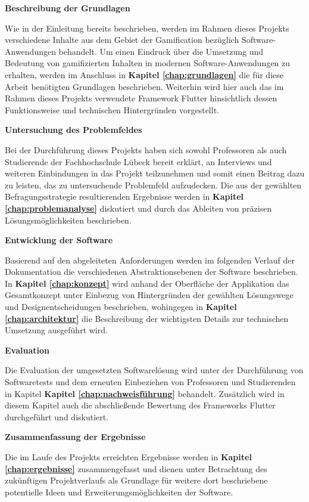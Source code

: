 \documentclass[bibliography=totoc,listof=totoc,BCOR=5mm,DIV=12,oneside]{scrbook}
\begin{document}
\par \bigskip \textbf{Beschreibung der Grundlagen}
\par Wie in der Einleitung bereits beschrieben, werden im Rahmen dieses Projekts verschiedene Inhalte aus dem Gebiet der Gamification bezüglich Software-Anwendungen behandelt. Um einen Eindruck über die Umsetzung und Bedeutung von gamifizierten Inhalten in modernen Software-Anwendungen zu erhalten, werden im Anschluss in \textbf{Kapitel \ref{chap:grundlagen}} die für diese Arbeit benötigten Grundlagen beschrieben. Weiterhin wird hier auch das im Rahmen dieses Projekts verwendete Framework Flutter hinsichtlich dessen Funktionsweise und technischen Hintergründen vorgestellt.

\par \bigskip \textbf{Untersuchung des Problemfeldes}
\par Bei der Durchführung dieses Projekts haben sich sowohl Professoren als auch Studierende der Fachhochschule Lübeck bereit erklärt, an Interviews und weiteren Einbindungen in das Projekt teilzunehmen und somit einen Beitrag dazu zu leisten, das zu untersuchende Problemfeld aufzudecken. Die aus der gewählten Befragungsstrategie resultierenden Ergebnisse werden in \textbf{Kapitel \ref{chap:problemanalyse}} diskutiert und durch das Ableiten von präzisen Lösungsmöglichkeiten beschrieben.

\par \bigskip \textbf{Entwicklung der Software}
\par Basierend auf den abgeleiteten Anforderungen werden im folgenden Verlauf der Dokumentation die verschiedenen Abstraktionsebenen der Software beschrieben. In \textbf{Kapitel \ref{chap:konzept}} wird anhand der Oberfläche der Applikation das Gesamtkonzept unter Einbezug von Hintergründen der gewählten Lösungswege und Designentscheidungen beschrieben, wohingegen in \textbf{Kapitel \ref{chap:architektur}} die Beschreibung der wichtigsten Details zur technischen Umsetzung ausgeführt wird.

\par \bigskip \textbf{Evaluation}
\par Die Evaluation der umgesetzten Softwarelösung wird unter der Durchführung von Softwaretests und dem erneuten Einbeziehen von Professoren und Studierenden in Kapitel \textbf{Kapitel \ref{chap:nachweisführung}} behandelt. Zusätzlich wird in diesem Kapitel auch die abschließende Bewertung des Frameworks Flutter durchgeführt und diskutiert.

\par \bigskip \textbf{Zusammenfassung der Ergebnisse}
\par Die im Laufe des Projekts erreichten Ergebnisse werden in \textbf{Kapitel \ref{chap:ergebnisse}} zusammengefasst und dienen unter Betrachtung des zukünftigen Projektverlaufs als Grundlage für weitere dort beschriebene potentielle Ideen und Erweiterungsmöglichkeiten der Software.
\end{document}
